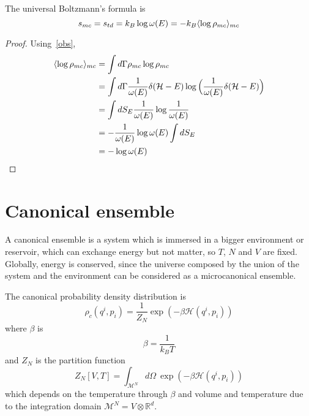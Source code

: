     The universal Boltzmann's formula is 
    \begin{equation*}
        s_{mc} = s_{td} = k_B \log \omega(E) = - k_B \langle\log \rho_{mc}\rangle_{mc}
    \end{equation*}

    \begin{proof}
        
    Using~\eqref{obs}, 
    \begin{equation*}
    \begin{aligned}
        \langle\log \rho_{mc}\rangle_{mc} & = \int d\Gamma \rho_{mc} \log \rho_{mc} \\ & = \int d\Gamma \frac{1}{\omega(E)} \delta (\mathcal H - E) \log \Big ( \frac{1}{\omega(E)} \delta (\mathcal H - E) \Big) \\ & = \int dS_E \frac{1}{\omega(E)} \log \frac{1}{\omega(E)} \\ & = - \frac{1}{\omega(E)} \log \omega(E) \int dS_E \\ & = - \log \omega (E)
    \end{aligned}
    \end{equation*}
    \end{proof}

\chapter{Canonical ensemble}

    A canonical ensemble is a system which is immersed in a bigger environment or reservoir, which can exchange energy but not matter, so $T$, $N$ and $V$ are fixed. Globally, energy is conserved, since the universe composed by the union of the system and the environment can be considered as a microcanonical ensemble. 

    The canonical probability density distribution is 
    \begin{equation*}
        \rho_c (q^i, p_i) = \frac{1}{Z_N} \exp (-\beta \mathcal H(q^i, p_i))
    \end{equation*}
    where $\beta$ is 
    \begin{equation*}
        \beta = \frac{1}{k_B T}
    \end{equation*}
    and $Z_N$ is the partition function 
    \begin{equation}
        Z_N[V, T] = \int_{\mathcal M^N} d\Omega ~\exp (-\beta \mathcal H(q^i, p_i))
    \end{equation}
    which depends on the temperature through $\beta$ and volume and temperature due to the integration domain $\mathcal M^N = V \otimes \mathbb R^d$.

